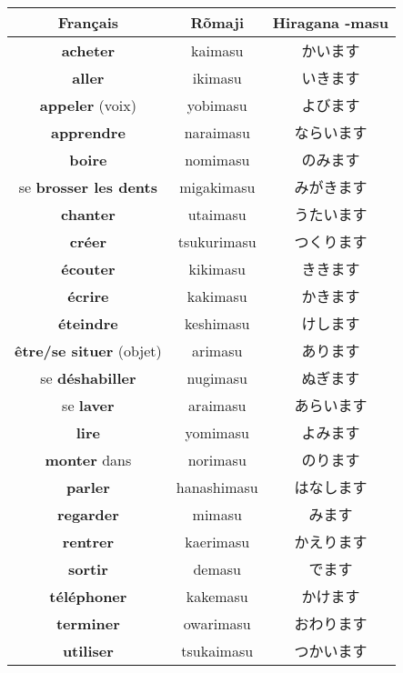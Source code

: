 \documentclass[11pt]{report}
\newenvironment{Japanese}{%
\CJKfamily{min}%
\CJKtilde  
\CJKnospace}{}
\begin{document}
\begin{CJK}{UTF8}{}  
\begin{Japanese}
	\begin{center}
		\begin{tabular}{|c|c|c|}
				\hline
				\textbf{Français} & \textbf{Rõmaji} & \textbf{Hiragana -masu} \\
				\hline
				\textbf{acheter} & kaimasu & かいます \\
				\hline
				\textbf{aller} & ikimasu & いきます \\
				\hline
				\textbf{appeler} (voix) & yobimasu & よびます \\
				\hline
				\textbf{apprendre} & naraimasu & ならいます \\
				\hline
				\textbf{boire} & nomimasu & のみます \\
				\hline
				se \textbf{brosser les dents} & migakimasu & みがきます \\
				\hline
				\textbf{chanter} & utaimasu & うたいます \\
				\hline
				\textbf{créer} & tsukurimasu & つくります \\
				\hline
				\textbf{écouter} & kikimasu & ききます \\
				\hline
				\textbf{écrire} & kakimasu & かきます \\
				\hline
				\textbf{éteindre} & keshimasu & けします \\
				\hline
				\textbf{être/se situer} (objet) & arimasu & あります \\
				\hline
				se \textbf{déshabiller} & nugimasu & ぬぎます \\
				\hline
				se \textbf{laver} & araimasu & あらいます \\
				\hline
				\textbf{lire} & yomimasu & よみます \\
				\hline
				\textbf{monter} dans & norimasu & のります \\
				\hline
				\textbf{parler} & hanashimasu & はなします \\
				\hline
				\textbf{regarder} & mimasu & みます \\
				\hline
				\textbf{rentrer} & kaerimasu & かえります \\
				\hline
				\textbf{sortir} & demasu & でます \\
				\hline
				\textbf{téléphoner} & kakemasu & かけます \\
				\hline
				\textbf{terminer} & owarimasu & おわります \\
				\hline
				\textbf{utiliser} & tsukaimasu & つかいます \\
				\hline
			\end{tabular}
	\end{center}
\end{Japanese}  
\end{CJK}
\end{document}
